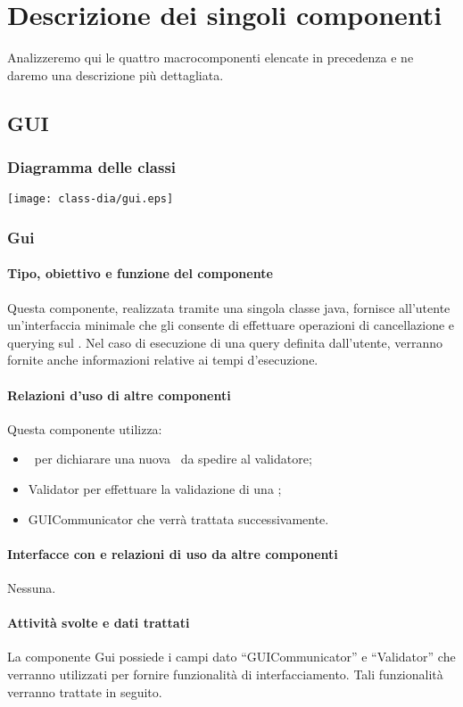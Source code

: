 \chapter{Descrizione dei singoli componenti}
Analizzeremo qui le quattro macrocomponenti elencate in precedenza e ne daremo una descrizione pi\`u dettagliata.

\section{GUI}
\subsection{Diagramma delle classi}
\begin{center}
\texttt{[image: class-dia/gui.eps]}
\end{center}
\subsection{Gui}
\subsubsection{Tipo, obiettivo e funzione del componente}
Questa componente, realizzata tramite una singola classe java, fornisce all'utente un'interfaccia minimale che gli consente di effettuare operazioni di cancellazione e querying sul \rp. Nel caso di esecuzione di una query definita dall'utente, verranno fornite anche informazioni relative ai tempi d'esecuzione.
\subsubsection{Relazioni d'uso di altre componenti}
Questa componente utilizza:
\begin{itemize}
 \item \BR\ per dichiarare una nuova \br\ da spedire al validatore;
 \item Validator per effettuare la validazione di una \br;
 \item GUICommunicator che verr\`a trattata successivamente.
\end{itemize}
\subsubsection{Interfacce con e relazioni di uso da altre componenti}
Nessuna.
\subsubsection{Attivit\`a svolte e dati trattati}
La componente Gui possiede i campi dato ``GUICommunicator'' e ``Validator'' che verranno utilizzati per fornire funzionalit\`a di interfacciamento. Tali funzionalit\`a verranno trattate in seguito.

